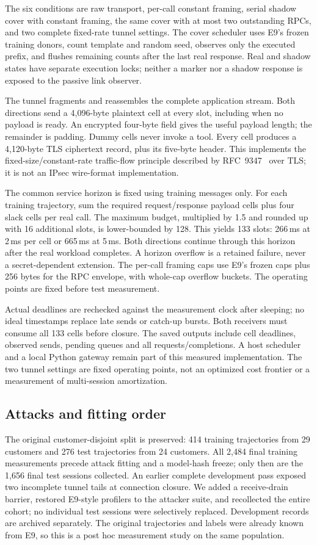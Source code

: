 The six conditions are raw transport, per-call constant framing, serial shadow cover with constant framing, the same cover with at most two outstanding RPCs, and two complete fixed-rate tunnel settings. The cover scheduler uses E9's frozen training donors, count template and random seed, observes only the executed prefix, and flushes remaining counts after the last real response. Real and shadow states have separate execution locks; neither a marker nor a shadow response is exposed to the passive link observer.

The tunnel fragments and reassembles the complete application stream. Both directions send a 4,096-byte plaintext cell at every slot, including when no payload is ready. An encrypted four-byte field gives the useful payload length; the remainder is padding. Dummy cells never invoke a tool. Every cell produces a 4,120-byte TLS ciphertext record, plus its five-byte header. This implements the fixed-size/constant-rate traffic-flow principle described by RFC~9347~\cite{rfc9347} over TLS; it is not an IPsec wire-format implementation.

The common service horizon is fixed using training messages only. For each training trajectory, sum the required request/response payload cells plus four slack cells per real call. The maximum budget, multiplied by 1.5 and rounded up with 16 additional slots, is lower-bounded by 128. This yields 133 slots: 266\,ms at 2\,ms per cell or 665\,ms at 5\,ms. Both directions continue through this horizon after the real workload completes. A horizon overflow is a retained failure, never a secret-dependent extension. The per-call framing caps use E9's frozen caps plus 256 bytes for the RPC envelope, with whole-cap overflow buckets. The operating points are fixed before test measurement.

Actual deadlines are rechecked against the measurement clock after sleeping; no ideal timestamps replace late sends or catch-up bursts. Both receivers must consume all 133 cells before closure. The saved outputs include cell deadlines, observed sends, pending queues and all requests/completions. A host scheduler and a local Python gateway remain part of this measured implementation. The two tunnel settings are fixed operating points, not an optimized cost frontier or a measurement of multi-session amortization.

\subsection{Attacks and fitting order}
The original customer-disjoint split is preserved: 414 training trajectories from 29 customers and 276 test trajectories from 24 customers. All 2,484 final training measurements precede attack fitting and a model-hash freeze; only then are the 1,656 final test sessions collected. An earlier complete development pass exposed two incomplete tunnel tails at connection closure. We added a receive-drain barrier, restored E9-style profilers to the attacker suite, and recollected the entire cohort; no individual test sessions were selectively replaced. Development records are archived separately. The original trajectories and labels were already known from E9, so this is a post hoc measurement study on the same population.

